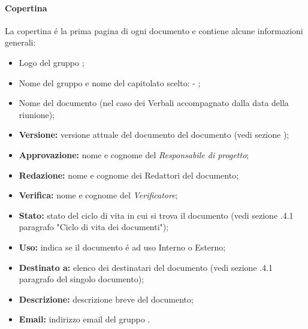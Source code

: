      \paragraph{Copertina\\}
      La copertina é la prima pagina di ogni documento e contiene alcune informazioni generali:
      \begin{itemize}
        \item Logo del gruppo \Gruppo{};
        \item Nome del gruppo e nome del capitolato scelto: \Gruppo{} - \NomeProgetto{};
        \item Nome del documento (nel caso dei Verbali accompagnato dalla data della riunione);
        \item \textbf{Versione:} versione attuale del documento del documento (vedi sezione );%
        \item \textbf{Approvazione:} nome e cognome del \textit{Responsabile di progetto};
        \item \textbf{Redazione:} nome e cognome dei Redattori del documento;
        \item \textbf{Verifica:} nome e cognome del \textit{Verificatore};
        \item \textbf{Stato:} stato del ciclo di vita in cui si trova il documento (vedi sezione .4.1 paragrafo "Ciclo di vita dei documenti");
        \item \textbf{Uso:} indica se il documento é ad uso Interno o Esterno;
        \item \textbf{Destinato a:} elenco dei destinatari del documento (vedi sezione .4.1 paragrafo del singolo documento);
        \item \textbf{Descrizione:} descrizione breve del documento;
        \item \textbf{Email:} indirizzo email del gruppo \Gruppo{}.
      \end{itemize}

